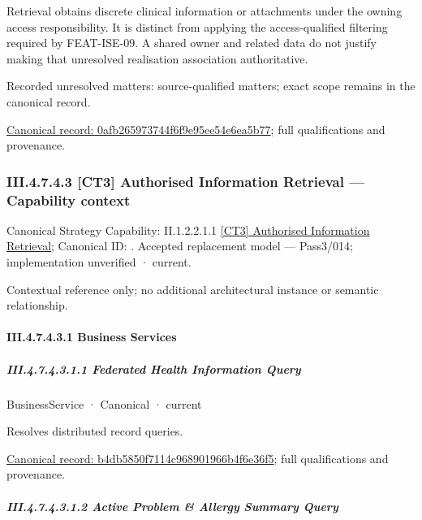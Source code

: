 Retrieval obtains discrete clinical information or attachments under the owning access responsibility. It is distinct from applying the access-qualified filtering required by FEAT-ISE-09. A shared owner and related data do not justify making that unresolved realisation association authoritative.


{\small Recorded unresolved matters: source-qualified matters; exact scope remains in the canonical record.}\par
{\footnotesize \href{../../../../../../../../continuum/business/business-function/0afb265973744f6f9e95ee54e6ea5b77.md}{Canonical record: 0afb265973744f6f9e95ee54e6ea5b77}; full qualifications and provenance.}\par
\subsubsection*{III.4.7.4.3 [CT3] Authorised Information Retrieval — Capability context}
\label{navigation:III.4.7.4.3}

{\small Canonical Strategy Capability: II.1.2.2.1.1 \hyperref[element:2c8a8c2de8a947478e06212a90ff066f]{[CT3] Authorised Information Retrieval}; Canonical ID: \texttt{}. Accepted replacement model — Pass3/014; implementation unverified · current.}\par
Contextual reference only; no additional architectural instance or semantic relationship.\par
\paragraph*{III.4.7.4.3.1 Business Services}
\label{navigation:III.4.7.4.3.1}

\subparagraph*{III.4.7.4.3.1.1 Federated Health Information Query}
\label{navigation:III.4.7.4.3.1.1}

\label{element:b4db5850f7114c968901966b4f6e36f5}
{\small BusinessService · Canonical · current}\par

Resolves distributed record queries.


{\footnotesize \href{../../../../../../../../continuum/business/business-service/b4db5850f7114c968901966b4f6e36f5.md}{Canonical record: b4db5850f7114c968901966b4f6e36f5}; full qualifications and provenance.}\par
\subparagraph*{III.4.7.4.3.1.2 Active Problem \& Allergy Summary Query}
\label{navigation:III.4.7.4.3.1.2}

